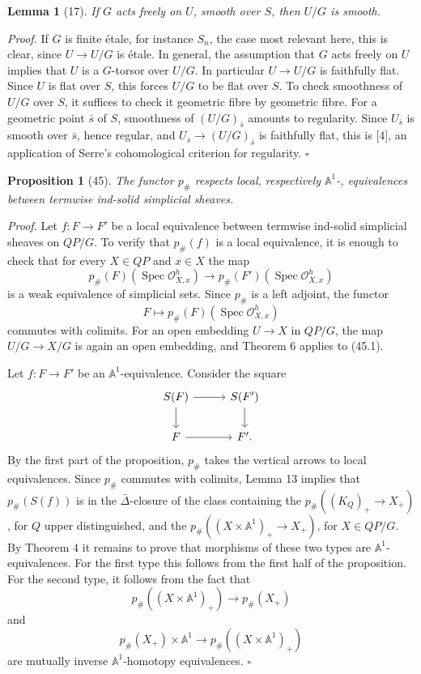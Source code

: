 \documentclass[11pt]{article}
\newcommand{\Aone}{\mathbb A^1}
\newcommand{\Spec}{\operatorname{Spec}}
\theoremstyle{deligne}
\newtheorem*{proposition*}{Proposition}
\newtheorem*{lemma*}{Lemma}
\newenvironment{proofdel}{\noindent\textit{Proof.}}{\hfill$\square$}
\begin{document}
\begin{lemma*}[17]
If \(G\) acts freely on \(U\), smooth over \(S\), then \(U/G\) is smooth.
\end{lemma*}

\begin{proofdel}
If \(G\) is finite étale, for instance \(S_n\), the case most relevant here, this is clear, since \(U\to U/G\) is étale. In general, the assumption that \(G\) acts freely on \(U\) implies that \(U\) is a \(G\)-torsor over \(U/G\). In particular \(U\to U/G\) is faithfully flat. Since \(U\) is flat over \(S\), this forces \(U/G\) to be flat over \(S\). To check smoothness of \(U/G\) over \(S\), it suffices to check it geometric fibre by geometric fibre. For a geometric point \(\bar s\) of \(S\), smoothness of \((U/G)_{\bar s}\) amounts to regularity. Since \(U_{\bar s}\) is smooth over \(\bar s\), hence regular, and \(U_{\bar s}\to(U/G)_{\bar s}\) is faithfully flat, this is [4], an application of Serre's cohomological criterion for regularity.
\end{proofdel}

\begin{proposition*}[45]
The functor \(p_\#\) respects local, respectively \(\Aone\)-, equivalences between termwise ind-solid simplicial sheaves.
\end{proposition*}

\begin{proofdel}
Let \(f:F\to F'\) be a local equivalence between termwise ind-solid simplicial sheaves on \(QP/G\). To verify that \(p_\#(f)\) is a local equivalence, it is enough to check that for every \(X\in QP\) and \(x\in X\) the map
\[
p_\#(F)(\Spec\mathcal O^h_{X,x})\longrightarrow
p_\#(F')(\Spec\mathcal O^h_{X,x})
\]
is a weak equivalence of simplicial sets. Since \(p_\#\) is a left adjoint, the functor
\[
F\longmapsto p_\#(F)(\Spec\mathcal O^h_{X,x})
\tag{45.1}
\]
commutes with colimits. For an open embedding \(U\to X\) in \(QP/G\), the map \(U/G\to X/G\) is again an open embedding, and Theorem 6 applies to (45.1).

Let \(f:F\to F'\) be an \(\Aone\)-equivalence. Consider the square
\[
\begin{tikzcd}[column sep=2.8em,row sep=1.8em]
S(F) \arrow[r] \arrow[d] & S(F') \arrow[d]\\
F \arrow[r] & F' .
\end{tikzcd}
\]
By the first part of the proposition, \(p_\#\) takes the vertical arrows to local equivalences. Since \(p_\#\) commutes with colimits, Lemma 13 implies that \(p_\#(S(f))\) is in the \(\bar\Delta\)-closure of the class containing the \(p_\#((K_Q)_+\to X_+)\), for \(Q\) upper distinguished, and the \(p_\#((X\times\Aone)_+\to X_+)\), for \(X\in QP/G\). By Theorem 4 it remains to prove that morphisms of these two types are \(\Aone\)-equivalences. For the first type this follows from the first half of the proposition. For the second type, it follows from the fact that
\[
p_\#((X\times\Aone)_+)\longrightarrow p_\#(X_+)
\]
and
\[
p_\#(X_+)\times\Aone\longrightarrow p_\#((X\times\Aone)_+)
\]
are mutually inverse \(\Aone\)-homotopy equivalences.
\end{proofdel}
\end{document}
